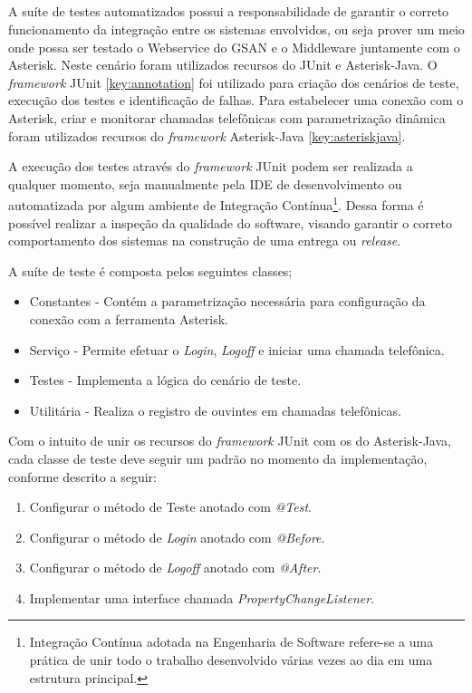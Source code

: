 \subsection{\fontsize{12}{1} }

A suíte de testes automatizados possui a responsabilidade de garantir o correto funcionamento da integração entre os sistemas envolvidos, ou seja prover um meio onde possa ser testado o Webservice do GSAN e o Middleware juntamente com o Asterisk. 
Neste cenário foram utilizados recursos do JUnit e Asterisk-Java. O \textit{framework} JUnit \ref{key:annotation} foi utilizado para criação dos cenários de teste, execução dos testes e identificação de falhas. Para estabelecer uma conexão com o Asterisk, criar e monitorar chamadas telefônicas com parametrização dinâmica foram utilizados recursos do \textit{framework} Asterisk-Java \ref{key:asteriskjava}.  

A execução dos testes através do \textit{framework} JUnit podem ser realizada a qualquer momento, seja manualmente pela IDE de desenvolvimento ou automatizada por algum ambiente de Integração Contínua\footnote{Integração Contínua adotada na Engenharia de Software refere-se a uma prática de unir todo o trabalho desenvolvido várias vezes ao dia em uma estrutura principal.}. Dessa forma é possível realizar a inspeção da qualidade do software, visando garantir o correto comportamento dos sistemas na construção de uma entrega ou \textit{release}.

A suíte de teste é composta pelos seguintes classes;
\begin{itemize}
	\item Constantes - Contém a parametrização necessária para configuração da conexão com a ferramenta Asterisk.
	\item Serviço - Permite efetuar o \textit{Login}, \textit{Logoff} e iniciar uma chamada telefônica.
	\item Testes - Implementa a lógica do cenário de teste.
	\item Utilitária - Realiza o registro de ouvintes em chamadas telefônicas.
\end{itemize}


Com o intuito de unir os recursos do \textit{framework} JUnit com os do Asterisk-Java, cada classe de teste deve seguir um padrão no momento da implementação, conforme descrito a seguir:

\begin{enumerate}
	\item Configurar o método de Teste anotado com \textit{@Test}.
	\item Configurar o método de \textit{Login} anotado com \textit{@Before}.
	\item Configurar o método de \textit{Logoff} anotado com \textit{@After}.
	\item Implementar uma interface chamada \textit{PropertyChangeListener}.	
\end{enumerate}

